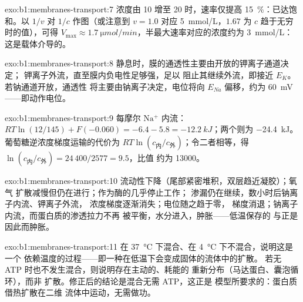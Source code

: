 \begin{solution}{exo:b1:membranes-transport:7}
浓度由 10 增至 20 时，速率仅提高
\qty{15}{\%}：已达饱和。以 $1/v$ 对 $1/c$ 作图（或注意到
$v = 1.0$ 对应 \qty{5}{mmol/L}，$1.67$ 为 $c$ 趋于无穷时的值），可得
$V_{\max} \approx \qty{1.7}{\micro mol/min}$，半最大速率对应的浓度约为
\qty{3}{mmol/L}：这是载体介导的。
\end{solution}

\begin{solution}{exo:b1:membranes-transport:8}
静息时，膜的通透性主要由开放的钾离子通道决定；
钾离子外流，直至膜内负电性足够强，足以
阻止其继续外流，即接近 $E_K$。若钠通道开放，通透性
将主要由钠离子决定，电位将向
$E_{Na}$ 偏移，约为 \qty{+60}{mV}——即动作电位。
\end{solution}

\begin{solution}{exo:b1:membranes-transport:9}
每摩尔 $\mathrm{Na^+}$ 内流：$RT\ln(12/145) + F(-0.060) = -6.4 - 5.8
= \qty{-12.2}{kJ}$；两个则为 \qty{-24.4}{kJ}。葡萄糖逆浓度梯度运输的代价为
$RT\ln(c_{\text{内}}/c_{\text{外}})$；令二者相等，得
$\ln(c_{\text{内}}/c_{\text{外}}) = 24\,400/2577 = 9.5$，比值
约为 \num{13000}。
\end{solution}

\begin{solution}{exo:b1:membranes-transport:10}
流动性下降（尾部紧密堆积，双层趋近凝胶）；氧气
扩散减慢但仍在进行；作为酶的几乎停止工作；
渗漏仍在继续，数小时后钠离子内流、钾离子外流，
浓度梯度逐渐消失；电位随之趋于零，
梯度消退；钠离子内流，而蛋白质的渗透拉力不再
被平衡，水分进入，肿胀——低温保存的
与正是因此而肿胀。
\end{solution}

\begin{solution}{exo:b1:membranes-transport:11}
在 \qty{37}{\celsius} 下混合、在 \qty{4}{\celsius} 下不混合，说明这是一个
依赖温度的过程——即一种在低温下会变成固体的流体中的扩散。
若无 ATP 时也不发生混合，则说明存在主动的、耗能的
重新分布（马达蛋白、囊泡循环），而非
扩散。修正后的结论是混合无需 ATP，这正是
模型所要求的：蛋白质借热扩散在二维
流体中运动，无需做功。
\end{solution}

